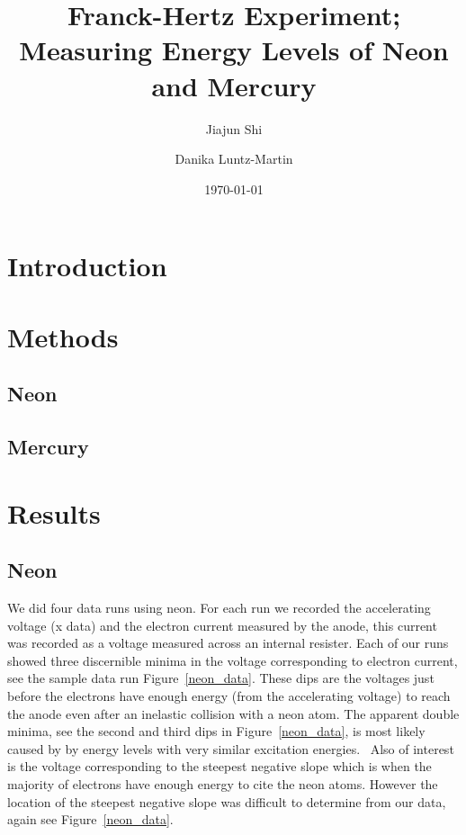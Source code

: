 \documentclass[prb,preprint]{revtex4-1}
\begin{document}
\title{Franck-Hertz Experiment; Measuring Energy Levels of Neon and Mercury}

\author{Jiajun Shi}


\author{Danika Luntz-Martin}


\date{\today}

\begin{abstract}


\end{abstract}


\maketitle 


\section{Introduction} 


\section{Methods}

\subsection{Neon}
\subsection{Mercury}


\section{Results}

\subsection{Neon}

We did four data runs using neon. For each run we recorded the accelerating voltage (x data) and the electron current measured by the anode, this current was recorded as a voltage measured across an internal resister. Each of our runs showed three discernible minima in the voltage corresponding to electron current, see the sample data run Figure~\ref{neon_data}. These dips are the voltages just before the electrons have enough energy (from the accelerating voltage) to reach the anode even after an inelastic collision with a neon atom. The apparent double minima, see the second and third dips in Figure~\ref{neon_data}, is most likely caused by by energy levels with very similar excitation energies.~\cite{newfeatures} Also of interest is the voltage corresponding to the steepest negative slope which is when the majority of electrons have enough energy to cite the neon atoms. However the location of the steepest negative slope was difficult to determine from our data, again see Figure~\ref{neon_data}.
\end{document}
